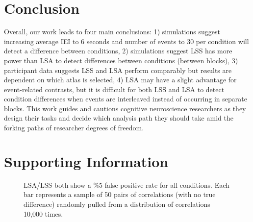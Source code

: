 \documentclass[phd,appendix,figures]{uithesis}
\begin{document}
\section{Conclusion}

Overall, our work leads to four main conclusions:
1) simulations suggest increasing average IEI to 6 seconds and number of events to 30 per condition will detect a difference between conditions, 
2) simulations suggest LSS has more power than LSA to detect differences between conditions (between blocks),
3) participant data suggests LSS and LSA perform comparably but results are dependent on which atlas is selected,
4) LSA may have a slight advantage for event-related contrasts,
but it is difficult for both LSS and LSA to detect condition differences when events are interleaved instead of occurring in separate blocks.
This work guides and cautions cognitive neuroscience researchers as they design their tasks and decide
which analysis path they should take amid the forking paths of researcher degrees of freedom.

\section{Supporting Information}

\begin{figure}[H]
  \centering


  \caption[Simulations of false positive rate for LSS/LSA]{
    LSA/LSS both show a \%5 false positive rate for all conditions.
    Each bar represents a sample of 50 pairs of correlations (with no true difference)
    randomly pulled from a distribution of correlations 10,000 times.
  }
  \label{fig:res_sim_fpr}
\end{figure}
\end{document}
